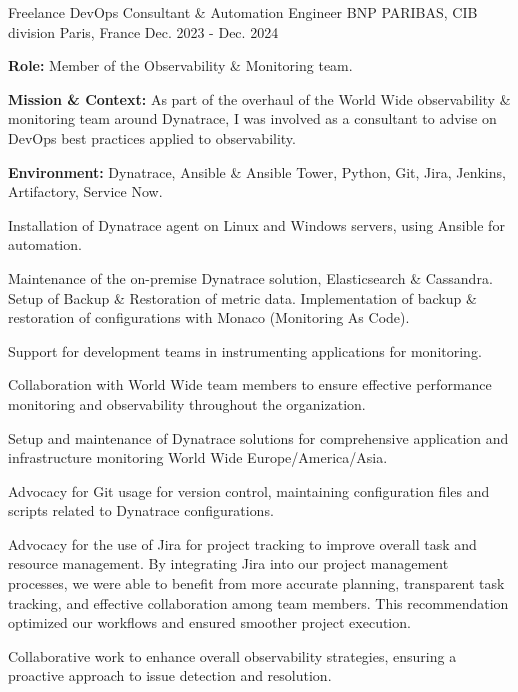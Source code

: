 
\begin{cventries}


\cventry
{Freelance DevOps Consultant \& Automation Engineer} %
{BNP PARIBAS, CIB division} %
{Paris, France} %
{Dec. 2023 - Dec. 2024} %
{
  \begin{cvitems} %
    \item {\textbf{Role:} Member of the Observability \& Monitoring team.}
    \item {\textbf{Mission \& Context:} As part of the overhaul of the World Wide observability \& monitoring team around Dynatrace, I was involved as a consultant to advise on DevOps best practices applied to observability.}
    \item {\textbf{Environment:} Dynatrace, Ansible \& Ansible Tower, Python, Git, Jira, Jenkins, Artifactory, Service Now.}
    \item {Installation of Dynatrace agent on Linux and Windows servers, using Ansible for automation.}
    \item {Maintenance of the on-premise Dynatrace solution, Elasticsearch \& Cassandra. Setup of Backup \& Restoration of metric data. Implementation of backup \& restoration of configurations with Monaco (Monitoring As Code).}
    \item {Support for development teams in instrumenting applications for monitoring.}
    \item {Collaboration with World Wide team members to ensure effective performance monitoring and observability throughout the organization.}
    \item {Setup and maintenance of Dynatrace solutions for comprehensive application and infrastructure monitoring World Wide Europe/America/Asia.}
    \item {Advocacy for Git usage for version control, maintaining configuration files and scripts related to Dynatrace configurations.}
    \item {Advocacy for the use of Jira for project tracking to improve overall task and resource management. By integrating Jira into our project management processes, we were able to benefit from more accurate planning, transparent task tracking, and effective collaboration among team members. This recommendation optimized our workflows and ensured smoother project execution.}
    \item {Collaborative work to enhance overall observability strategies, ensuring a proactive approach to issue detection and resolution.}
  \end{cvitems}
}


\end{cventries}
